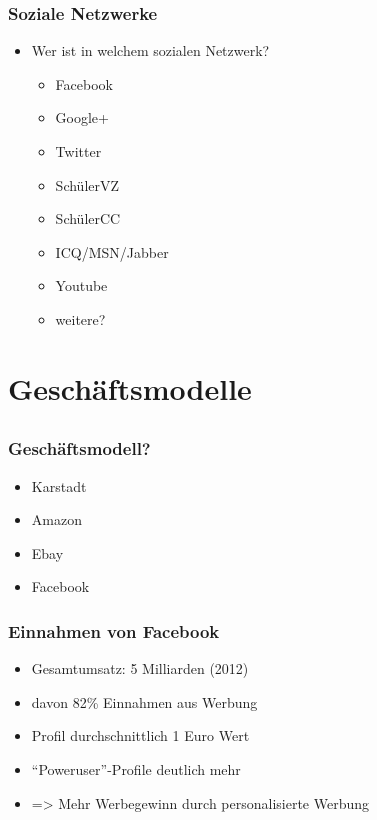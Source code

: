 \documentclass[12pt]{beamer}
\begin{document}
\begin{frame}
  \frametitle{Soziale Netzwerke}
  \begin{itemize}
    \item Wer ist in welchem sozialen Netzwerk?
      \begin{itemize}
        \item Facebook
        \item Google+
        \item Twitter
        \item SchülerVZ
        \item SchülerCC
        \item ICQ/MSN/Jabber
        \item Youtube
        \item weitere?
      \end{itemize}
  \end{itemize}
\end{frame}

\section{Geschäftsmodelle}
\subsection{}

\begin{frame}
  \frametitle{Geschäftsmodell?}
  \begin{itemize}
    \item<2-> Karstadt
    \item<3-> Amazon
    \item<4-> Ebay
    \item<5-> Facebook
  \end{itemize}
\end{frame}

\begin{frame}
  \frametitle{Einnahmen von Facebook}
  \begin{itemize}
    \item<1-> Gesamtumsatz: 5 Milliarden (2012)
    \item<2-> davon 82\% Einnahmen aus Werbung
    \item<4-> Profil durchschnittlich 1 Euro Wert
    \item<5-> "`Poweruser"'-Profile deutlich mehr
    \item<6-> => Mehr Werbegewinn durch personalisierte Werbung
  \end{itemize}
\end{frame}
\end{document}
